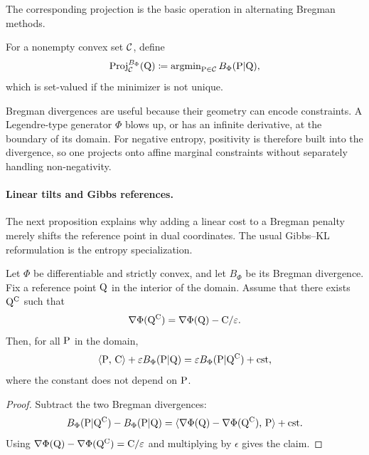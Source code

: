 The corresponding projection is the basic operation in alternating Bregman methods.
\begin{defn}\label{def-bregman-projection}
For a nonempty convex set $\Cc$, define
\[
	\Proj_{\Cc}^{B_\Phi}(\Q)
	\eqdef
	\argmin_{\P\in\Cc} B_\Phi(\P|\Q),
\]
which is set-valued if the minimizer is not unique.
\end{defn}

Bregman divergences are useful because their geometry can encode constraints. A Legendre-type generator $\Phi$ blows up, or has an infinite derivative, at the boundary of its domain. For negative entropy, positivity is therefore built into the divergence, so one projects onto affine marginal constraints without separately handling non-negativity.

\paragraph{Linear tilts and Gibbs references.}

The next proposition explains why adding a linear cost to a Bregman penalty merely shifts the reference point in dual coordinates. The usual Gibbs--KL reformulation is the entropy specialization.

\begin{prop}\label{prop-bregman-linear-tilt}
	Let $\Phi$ be differentiable and strictly convex, and let $B_\Phi$ be its Bregman divergence. Fix a reference point $\Q$ in the interior of the domain. Assume that there exists $\Q^\C$ such that
	\[
		\nabla\Phi(\Q^\C)=\nabla\Phi(\Q)-\C/\epsilon.
	\]
	Then, for all $\P$ in the domain,
	\[
		\dotp{\P}{\C}+\epsilon B_\Phi(\P|\Q)
		=
		\epsilon B_\Phi(\P|\Q^\C)+\text{\upshape cst},
	\]
	where the constant does not depend on $\P$.
\end{prop}
\begin{proof}
	Subtract the two Bregman divergences:
	\[
		B_\Phi(\P|\Q^\C)-B_\Phi(\P|\Q)
		=
		\dotp{\nabla\Phi(\Q)-\nabla\Phi(\Q^\C)}{\P}
		+\text{cst}.
	\]
	Using $\nabla\Phi(\Q)-\nabla\Phi(\Q^\C)=\C/\epsilon$ and multiplying by $\epsilon$ gives the claim.
\end{proof}

